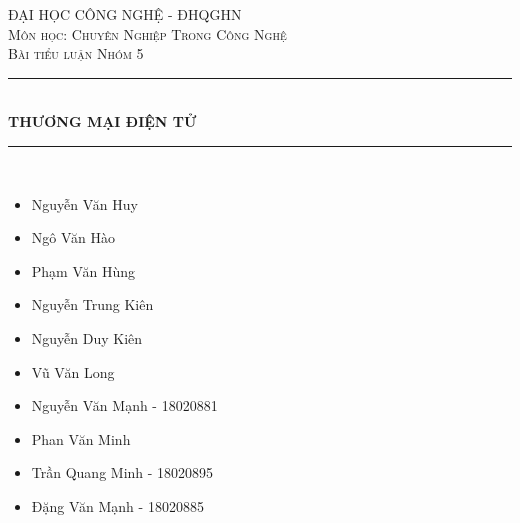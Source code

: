 \documentclass[12pt]{article}
\begin{document}
\begin{titlepage}

\newcommand{\HRule}{\rule{\linewidth}{0.5mm}}
\center
 

\textsc{\LARGE ĐẠI HỌC CÔNG NGHỆ - ĐHQGHN}\\[1.5cm]
\textsc{\Large Môn học: Chuyên Nghiệp Trong Công Nghệ}\\[0.5cm]
\textsc{\large Bài tiểu luận Nhóm 5 }\\[0.5cm]


\HRule \\[0.4cm]
{ \huge \bfseries THƯƠNG MẠI ĐIỆN TỬ}\\[0.4cm] %
\HRule \\[1.5cm]
 

\begin{minipage}{1.2\textwidth}
\begin{multicols}{2}
\begin{itemize}
    \item Nguyễn Văn Huy
    \item Ngô Văn Hào
    \item Phạm Văn Hùng
    \item Nguyễn Trung Kiên
    \item Nguyễn Duy Kiên
    \item Vũ Văn Long
    \item Nguyễn Văn Mạnh - 18020881
    \item Phan Văn Minh
    \item Trần Quang Minh - 18020895
    \item Đặng Văn Mạnh - 18020885
\end{itemize}
\end{multicols}
\end{minipage}\\[2cm]



\end{titlepage}
\end{document}
